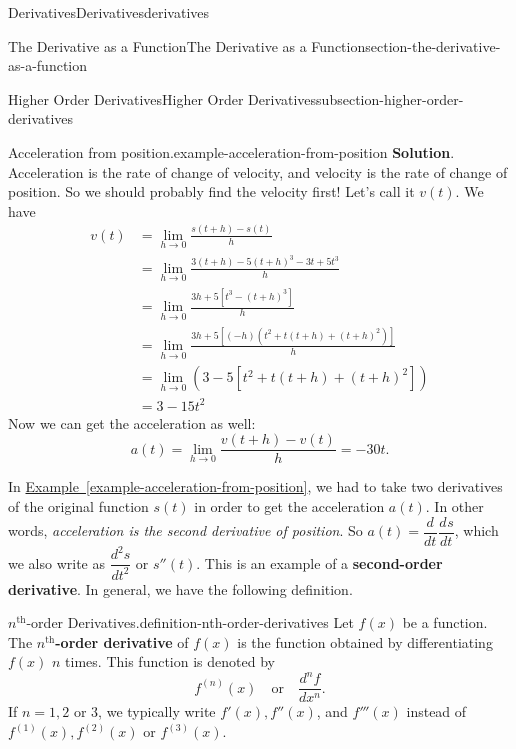 \documentclass[oneside,10pt,]{book}
\newcommand{\terminology}[1]{\textbf{#1}}
\numberwithin{equation}{section}
\newcommand{\dv}[3][]{\dfrac{d^{#1} #2}{d #3^{#1}}}
\begin{document}
\begin{chapterptx}{Derivatives}{}{Derivatives}{}{}{derivatives}
\begin{sectionptx}{The Derivative as a Function}{}{The Derivative as a Function}{}{}{section-the-derivative-as-a-function}
\begin{subsectionptx}{Higher Order Derivatives}{}{Higher Order Derivatives}{}{}{subsection-higher-order-derivatives}
\begin{example}{Acceleration from position.}{example-acceleration-from-position}
\noindent\textbf{Solution}.\hypertarget{solution-25}{}\quad%
\hypertarget{p-117}{}%
Acceleration is the rate of change of velocity, and velocity is the rate of change of position. So we should probably find the velocity first! Let's call it \(v(t)\). We have%
\begin{align*}
v(t) & = \lim_{h\to0}\frac{s(t+h) - s(t)}{h} \\
& = \lim_{h\to0}\frac{3(t+h) - 5(t+h)^{3} - 3t + 5t^{3}}{h} \\
& = \lim_{h\to0}\frac{3h + 5[t^{3} - (t+h)^{3}]}{h} \\
& = \lim_{h\to0}\frac{3h + 5[(-h)(t^{2} + t(t+h) + (t+h)^{2})]}{h} \\
& = \lim_{h\to0}(3 - 5[t^{2} + t(t+h) + (t+h)^{2}]) \\
& = 3 - 15t^{2} 
\end{align*}
Now we can get the acceleration as well:%
\begin{equation*}
a(t) = \lim_{h\to0}\frac{v(t+h) - v(t)}{h} = -30t.
\end{equation*}
%
\end{example}
\hypertarget{p-118}{}%
In \hyperref[example-acceleration-from-position]{Example~\ref{example-acceleration-from-position}}, we had to take two derivatives of the original function \(s(t)\) in order to get the acceleration \(a(t)\). In other words, \emph{acceleration is the second derivative of position}. So \(a(t) = \dv{}{t}\dv{s}{t}\), which we also write as \(\dv[2]{s}{t}\) or \(s''(t)\). This is an example of a \terminology{second-order derivative}. In general, we have the following definition.%
\begin{definition}{\(n^{\text{th}}\)-order Derivatives.}{definition-nth-order-derivatives}%
\hypertarget{p-119}{}%
Let \(f(x)\) be a function. The \terminology{\(n^{\text{th}}\)-order derivative} of \(f(x)\) is the function obtained by differentiating \(f(x)\) \(n\) times. This function is denoted by%
\begin{equation*}
f^{(n)}(x)\quad\text{or}\quad\dv[n]{f}{x}.
\end{equation*}
If \(n=1, 2\) or \(3\), we typically write \(f'(x), f''(x)\), and \(f'''(x)\) instead of \(f^{(1)}(x), f^{(2)}(x)\) or \(f^{(3)}(x)\).%
\end{definition}
\hypertarget{p-120}{}%

\end{subsectionptx}
\end{sectionptx}
\end{chapterptx}
\end{document}
